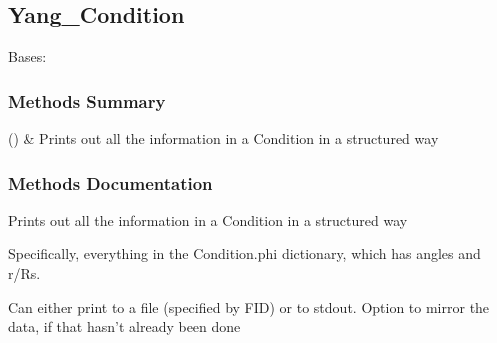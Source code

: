 \documentclass[letterpaper,10pt,english]{sphinxmanual}
\begin{document}
\sphinxstepscope


\subsection{Yang\_Condition}
\label{\detokenize{api/MARIGOLD.Yang_Condition:yang-condition}}\label{\detokenize{api/MARIGOLD.Yang_Condition::doc}}

\begin{fulllineitems}
\label{\detokenize{api/MARIGOLD.Yang_Condition:MARIGOLD.Yang_Condition}}
\pysigstartsignatures
{}
\pysigstopsignatures
\sphinxAtStartPar
Bases: 
\subsubsection*{Methods Summary}


\begin{savenotes}\sphinxattablestart
\sphinxthistablewithglobalstyle
\sphinxthistablewithnovlinesstyle
\centering
\begin{tabulary}{\linewidth}[t]{}
\sphinxtoprule
\sphinxtableatstartofbodyhook
\sphinxAtStartPar
{}()
&
\sphinxAtStartPar
Prints out all the information in a Condition in a structured way
\\
\sphinxbottomrule
\end{tabulary}
\sphinxtableafterendhook\par
\sphinxattableend\end{savenotes}
\subsubsection*{Methods Documentation}

\begin{fulllineitems}
\label{\detokenize{api/MARIGOLD.Yang_Condition:MARIGOLD.Yang_Condition.pretty_print}}
\pysigstartsignatures
{}
\pysigstopsignatures
\sphinxAtStartPar
Prints out all the information in a Condition in a structured way

\sphinxAtStartPar
Specifically, everything in the Condition.phi dictionary, which has angles
and r/Rs.

\sphinxAtStartPar
Can either print to a file (specified by FID) or to stdout. Option to mirror the
data, if that hasn’t already been done

\end{fulllineitems}


\end{fulllineitems}
\end{document}
